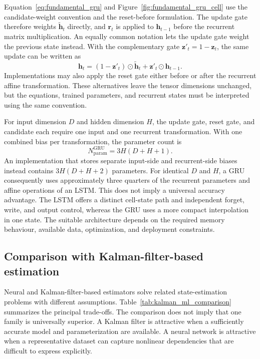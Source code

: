 \documentclass[
    a4paper,
    12pt,
    titlepage,
    bibliography=totoc,
    twoside=on,
    parskip=false,
    numbers=noenddot,
    cleardoublepage=empty,
    DIV=12,
    BCOR=12.0mm,
    headheight=36pt,
    headings=openright
]{scrreprt}
\begin{document}
Equation~\eqref{eq:fundamental_gru} and Figure~\ref{fig:fundamental_gru_cell} use the candidate-weight convention and the reset-before formulation. The update gate therefore weights $\tilde{\mathbf{h}}_t$ directly, and $\mathbf{r}_t$ is applied to $\mathbf{h}_{t-1}$ before the recurrent matrix multiplication. An equally common notation lets the update gate weight the previous state instead. With the complementary gate $\mathbf{z}'_t=1-\mathbf{z}_t$, the same update can be written as
\begin{equation}
    \mathbf{h}_t
    =
    (1-\mathbf{z}'_t)\odot\tilde{\mathbf{h}}_t
    +
    \mathbf{z}'_t\odot\mathbf{h}_{t-1}.
    \label{eq:fundamental_gru_complementary_notation}
\end{equation}
Implementations may also apply the reset gate either before or after the recurrent affine transformation. These alternatives leave the tensor dimensions unchanged, but the equations, trained parameters, and recurrent states must be interpreted using the same convention.

For input dimension $D$ and hidden dimension $H$, the update gate, reset gate, and candidate each require one input and one recurrent transformation. With one combined bias per transformation, the parameter count is
\begin{equation}
    N_{\mathrm{param}}^{\mathrm{GRU}}
    =
    3H(D+H+1).
    \label{eq:fundamental_gru_parameters}
\end{equation}
An implementation that stores separate input-side and recurrent-side biases instead contains $3H(D+H+2)$ parameters. For identical $D$ and $H$, a GRU consequently uses approximately three quarters of the recurrent parameters and affine operations of an LSTM. This does not imply a universal accuracy advantage. The LSTM offers a distinct cell-state path and independent forget, write, and output control, whereas the GRU uses a more compact interpolation in one state. The suitable architecture depends on the required memory behaviour, available data, optimization, and deployment constraints.

\subsection{Comparison with Kalman-filter-based estimation}
\label{sec:kalman_neural_comparison}
Neural and Kalman-filter-based estimators solve related state-estimation problems with different assumptions. Table~\ref{tab:kalman_ml_comparison} summarizes the principal trade-offs. The comparison does not imply that one family is universally superior. A Kalman filter is attractive when a sufficiently accurate model and parameterization are available. A neural network is attractive when a representative dataset can capture nonlinear dependencies that are difficult to express explicitly.
\end{document}
